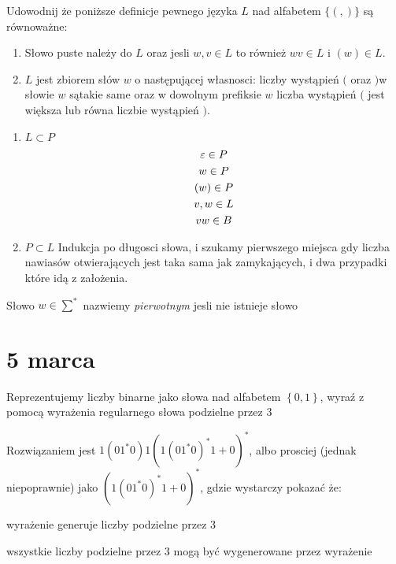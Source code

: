 \documentclass[11pt]{scrartcl}
\begin{document}
  \begin{zadanie}
    Udowodnij że poniższe definicje pewnego języka $L$ nad alfabetem $\{ ( , ) \}$ są równoważne:
    \begin{enumerate}
        \item Słowo puste należy do $L$ oraz jesli $w , v \in L $ to również $wv \in L$ i $(w) \in L$.
        \item $L$ jest zbiorem słów $w$ o następującej własnosci: liczby wystąpień $($ oraz $) $w słowie $w$ sątakie same oraz w dowolnym prefiksie $w$ liczba wystąpień $($ jest większa lub równa liczbie wystąpień $)$.
      
    \end{enumerate}
  \end{zadanie}
      \begin{enumerate}
          \item $L \subset P$
            \begin{gather*}
                \varepsilon \in P \\
                w \in P \\
                (w) \in P \\
                v, w \in L \\
                vw \in B
            \end{gather*}
          \item $P \subset L$
            Indukcja po długosci słowa, i szukamy pierwszego miejsca gdy liczba nawiasów otwierających jest taka sama jak zamykających, i dwa przypadki które idą z założenia.
      \end{enumerate}
  \begin{zadanie}
    Słowo $w \in \sum^*$ nazwiemy \textit{pierwotnym} jesli nie istnieje słowo 
  \end{zadanie}

  \section{5 marca}
      
  \begin{zadanie}
      Reprezentujemy liczby binarne jako słowa nad alfabetem $\left \{ 0, 1 \right \}$, wyraź z pomocą wyrażenia regularnego słowa podzielne przez 3 
  \end{zadanie}
  
  Rozwiązaniem jest $1\left ( 01^*0 \right ) 1 \left ( 1 \left ( 01^*0 \right )^* 1 + 0 \right )^*$, albo prosciej (jednak niepoprawnie) jako $(1(01^*0)^*1+ 0)^*$, gdzie wystarczy pokazać że:
  \begin{walk}
      \item wyrażenie generuje liczby podzielne przez 3
      \item wszystkie liczby podzielne przez 3 mogą być wygenerowane przez wyrażenie
  \end{walk}
  
\end{document}
